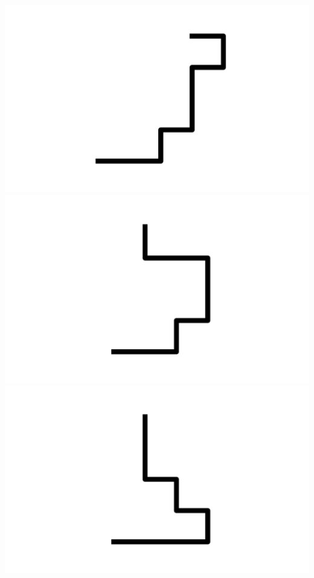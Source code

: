 \documentclass[]{report}
\begin{document}
\includegraphics[scale=.1]{pictures/21/state_cluster_shapes_418.pdf} 
\includegraphics[scale=.1]{pictures/21/state_cluster_shapes_419.pdf} 
\includegraphics[scale=.1]{pictures/21/state_cluster_shapes_420.pdf} 
\end{document}
